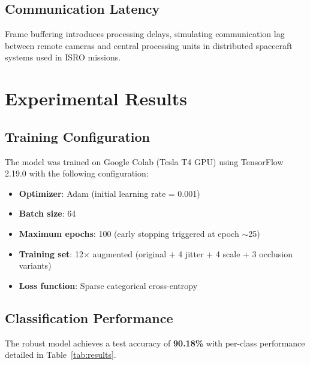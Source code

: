 \documentclass[conference]{IEEEtran}
\begin{document}
\subsection{Communication Latency}
Frame buffering introduces processing delays, simulating communication lag between remote cameras and central processing units in distributed spacecraft systems used in ISRO missions.

\section{Experimental Results}

\subsection{Training Configuration}
The model was trained on Google Colab (Tesla T4 GPU) using TensorFlow 2.19.0 \cite{ref_tensorflow} with the following configuration:
\begin{itemize}
    \item \textbf{Optimizer}: Adam (initial learning rate = 0.001)
    \item \textbf{Batch size}: 64
    \item \textbf{Maximum epochs}: 100 (early stopping triggered at epoch $\sim$25)
    \item \textbf{Training set}: 12$\times$ augmented (original + 4 jitter + 4 scale + 3 occlusion variants)
    \item \textbf{Loss function}: Sparse categorical cross-entropy
\end{itemize}

\subsection{Classification Performance}

The robust model achieves a test accuracy of \textbf{90.18\%} with per-class performance detailed in Table~\ref{tab:results}.
\end{document}
